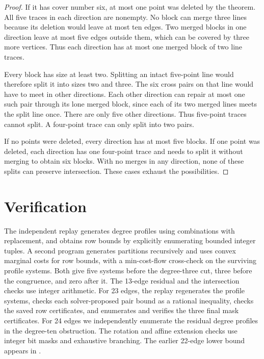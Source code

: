 \documentclass[10pt]{article}
\begin{document}
\begin{proof}
If it has cover number six, at most one point was deleted by the
theorem. All five traces in each direction are nonempty.
No block can merge three lines because its deletion would leave at
most ten edges. Two merged blocks in one direction leave at most five
edges outside them, which can be covered by three more vertices.
Thus each direction has at most one merged block of two line traces.

Every block has size at least two. Splitting an intact five-point
line would therefore split it into sizes two and three. The six cross
pairs on that line would have to meet in other directions. Each other
direction can repair at most one such pair through its lone merged
block, since each of its two merged lines meets the split line once.
There are only five other directions. Thus five-point traces
cannot split. A four-point trace can only split into two pairs.

If no points were deleted, every direction has at most five blocks.
If one point was deleted, each direction has one
four-point trace and needs to split it without merging to obtain six
blocks. With no merges in any direction, none of these splits can
preserve intersection. These cases exhaust the possibilities.
\end{proof}

\section{Verification}

The independent replay generates degree profiles using combinations
with replacement, and obtains row bounds by explicitly enumerating
bounded integer tuples. A second program generates partitions
recursively and uses convex marginal costs for row bounds, with a
min-cost-flow cross-check on the surviving profile systems.
Both give five systems before the degree-three cut, three before
the congruence, and zero after it. The 13-edge residual and the
intersection checks use integer arithmetic. For 23 edges, the replay
regenerates the profile systems, checks each solver-proposed pair bound
as a rational inequality, checks the saved row certificates, and
enumerates and verifies the three final mask certificates.
For 24 edges we independently enumerate the residual degree profiles
in the degree-ten obstruction. The rotation and affine extension
checks use integer bit masks and exhaustive branching.
The earlier 22-edge lower bound appears in \cite{hrk}.
\end{document}
